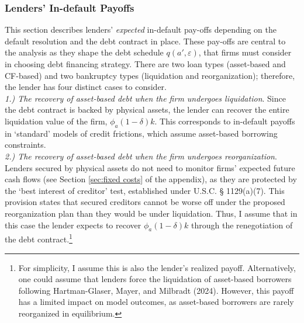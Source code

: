 \documentclass[12pt]{article}
\begin{document}
\subsubsection{Lenders' In-default Payoffs}   \label{sec:Default Payoffs}
This section describes lenders' \textit{expected} in-default pay-offs depending on the default resolution and the debt contract in place. These pay-offs are central to the analysis as they shape the debt schedule $q(a', \varepsilon)$, that firms must consider in choosing debt financing strategy. There are two loan types (asset-based and CF-based) and two bankruptcy types (liquidation and reorganization); therefore, the lender has four distinct cases to consider. \vspace{3mm} \\
\textit{ 1.) The recovery of asset-based debt when the firm undergoes liquidation}. Since the debt contract is backed by physical assets, the lender can recover the entire liquidation value of the firm, $\phi_a(1-\delta)k$. This corresponds to in-default payoffs in `standard' models of credit frictions, which assume asset-based borrowing constraints. \vspace{3mm} \\
\textit{ 2.) The recovery of asset-based debt when the firm undergoes reorganization}. Lenders secured by physical assets do not need to monitor firms' expected future cash flows (see Section \ref{sec:fixed costs} of the appendix), as they are protected by the ‘best interest of creditor' test, established under U.S.C. § 1129(a)(7). This provision states that secured creditors cannot be worse off under the proposed reorganization plan than they would be under liquidation. Thus, I assume that in this case the lender expects to recover $\phi_a(1-\delta)k$ through the renegotiation of the debt contract.\footnote{For simplicity, I assume this is also the lender's realized payoff.  Alternatively, one could assume that lenders force the liquidation of asset-based borrowers following Hartman-Glaser, Mayer, and Milbradt (2024). However, this payoff has a limited impact on model outcomes, as asset-based borrowers are rarely reorganized in equilibrium.} \vspace{3mm} \\
\end{document}
